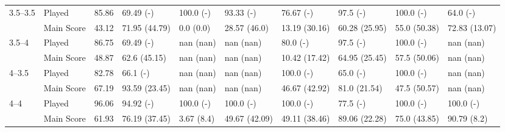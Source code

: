 \begin{tabular}{llrlllllll}
\cline{1-10}
\multirow[t]{2}{*}{3.5--3.5} & Played & 85.86 & 69.49 (-) & 100.0 (-) & 93.33 (-) & 76.67 (-) & 97.5 (-) & 100.0 (-) & 64.0 (-) \\
 & Main Score & 43.12 & 71.95 (44.79) & 0.0 (0.0) & 28.57 (46.0) & 13.19 (30.16) & 60.28 (25.95) & 55.0 (50.38) & 72.83 (13.07) \\
\cline{1-10}
\multirow[t]{2}{*}{3.5--4} & Played & 86.75 & 69.49 (-) & nan (nan) & nan (nan) & 80.0 (-) & 97.5 (-) & 100.0 (-) & nan (nan) \\
 & Main Score & 48.87 & 62.6 (45.15) & nan (nan) & nan (nan) & 10.42 (17.42) & 64.95 (25.45) & 57.5 (50.06) & nan (nan) \\
\cline{1-10}
\multirow[t]{2}{*}{4--3.5} & Played & 82.78 & 66.1 (-) & nan (nan) & nan (nan) & 100.0 (-) & 65.0 (-) & 100.0 (-) & nan (nan) \\
 & Main Score & 67.19 & 93.59 (23.45) & nan (nan) & nan (nan) & 46.67 (42.92) & 81.0 (21.54) & 47.5 (50.57) & nan (nan) \\
\cline{1-10}
\multirow[t]{2}{*}{4--4} & Played & 96.06 & 94.92 (-) & 100.0 (-) & 100.0 (-) & 100.0 (-) & 77.5 (-) & 100.0 (-) & 100.0 (-) \\
 & Main Score & 61.93 & 76.19 (37.45) & 3.67 (8.4) & 49.67 (42.09) & 49.11 (38.46) & 89.06 (22.28) & 75.0 (43.85) & 90.79 (8.2) \\
\cline{1-10}
\bottomrule
\end{tabular}
